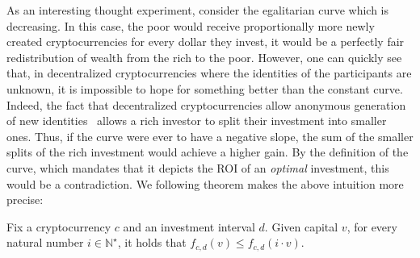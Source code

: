 As an interesting thought experiment, consider the egalitarian curve which is
decreasing. In this case, the poor would receive proportionally more newly
created cryptocurrencies for every dollar they invest, \ie it would be a
perfectly fair redistribution of wealth from the rich to the poor. However, one
can quickly see that, in decentralized cryptocurrencies where the identities of
the participants are unknown, it is impossible to
hope for something better than the constant curve. Indeed, the fact that
decentralized cryptocurrencies allow anonymous generation of new
identities~\cite{sybil}
allows a rich investor to split their investment into smaller ones.  Thus, if
the curve were ever to have a negative slope, the sum of the smaller splits of
the rich investment would achieve a higher gain. By the definition of the
curve, which mandates that it depicts the ROI of an \emph{optimal} investment,
this would be a contradiction. We following theorem makes the above intuition
more precise:

\begin{theorem}\label{thm:sybil}
    Fix a cryptocurrency $c$ and an investment interval $d$. Given capital $v$,
    for every natural number $i \in \mathbb{N}^\star$, it
    holds that $f_{c,d}(v) \leq f_{c,d}(i \cdot v)$.
\end{theorem}

